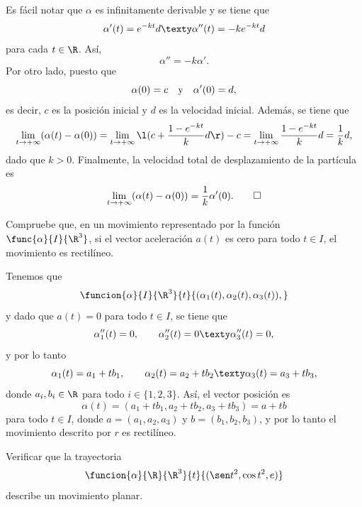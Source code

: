 \documentclass[a4,11pt]{aleph-examen}
\begin{document}
\begin{preguntas}
\begin{respuesta}
	Es fácil notar que $\alpha$ es infinitamente derivable y se tiene que
	\[
		\alpha'(t)=e^{-kt}d 
		\texty
		\alpha''(t)=-ke^{-kt}d
	\]
	para cada $t\in\R$. Así,
	\[
		\alpha''=-k\alpha'.
	\]
	Por otro lado, puesto que
	\[
		\alpha(0)=c\quad \text y \quad 
		\alpha'(0)=d,
	\]
	es decir, $c$ es la posición inicial y $d$ es la velocidad inicial. Además, se tiene que
	\[
		\lim_{t\to+\infty}( \alpha(t) - \alpha(0) )
		=\lim_{t\to+\infty} \l(c+\dfrac{1-e^{-kt}}{k}d\r) - c
		=\lim_{t\to+\infty} \dfrac{1-e^{-kt}}{k}d
		=\dfrac{1}{k}d,
	\]
	dado que $k>0$. Finalmente, la velocidad total de desplazamiento de la partícula es
	\[
		\lim_{t\to+\infty}( \alpha(t) - \alpha(0) )
		=\dfrac{1}{k}\alpha'(0). \qedhere
	\]
\end{respuesta}

\item
	Compruebe que, en un movimiento representado por la función $\func{\alpha}{I}{\R^3}$, si el vector aceleración $a(t)$ es cero para todo $t\in I$, el movimiento es rectilíneo.
	
\begin{respuesta}
    Tenemos que
    \[
    	\funcion{\alpha}{I}{\R^3}{t}{(\alpha_1(t),\alpha_2(t),\alpha_3(t)),}
    \]
    y dado que $a(t)=0$ para todo $t\in I$, se tiene que
    \[
        \alpha_1''(t)=0,
        \qquad
        \alpha_2''(t)=0
        \texty
        \alpha_3''(t)=0,
    \]
    y por lo tanto
    \[
        \alpha_1(t)=a_1+tb_1,
        \qquad
        \alpha_2(t)=a_2+tb_2
        \texty
        \alpha_3(t)=a_3+tb_3,
    \]
    donde $a_i,b_i\in\R$ para todo $i\in\{1,2,3\}$.
    Así, el vector posición es
    \[
        \alpha(t)=(a_1+tb_1,a_2+tb_2,a_3+tb_3)=a+tb
    \]
    para todo $t\in I$, donde $a=(a_1,a_2,a_3)$ y $b=(b_1,b_2,b_3)$, y por lo tanto el movimiento descrito por $r$ es rectilíneo.
\end{respuesta}

\item
    Verificar que la trayectoria 
    \[
        \funcion{\alpha}{\R}{\R^3}{t}{(\sen t^2,\cos t^2,e)}
    \]
    describe un movimiento planar.
    

\end{preguntas}
\end{document}
